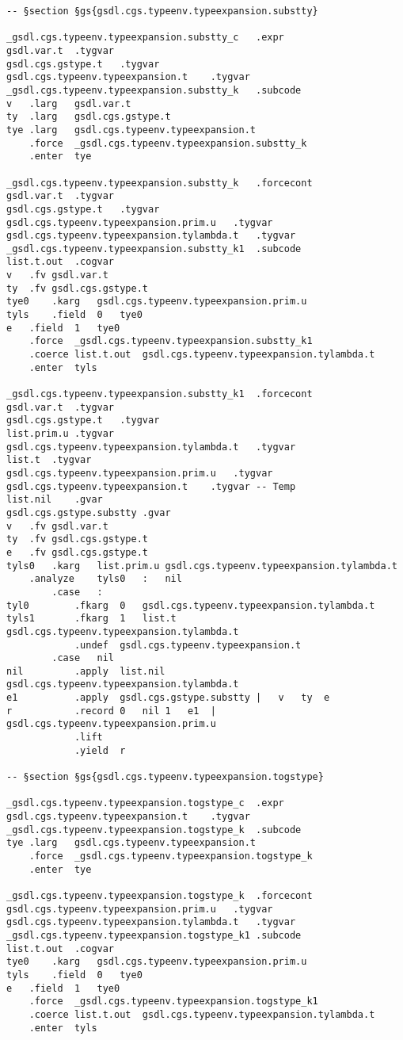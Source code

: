 \documentclass{report}
\begin{document}
\begin{verbatim}
-- §section §gs{gsdl.cgs.typeenv.typeexpansion.substty}

_gsdl.cgs.typeenv.typeexpansion.substty_c	.expr
gsdl.var.t	.tygvar
gsdl.cgs.gstype.t	.tygvar
gsdl.cgs.typeenv.typeexpansion.t	.tygvar
_gsdl.cgs.typeenv.typeexpansion.substty_k	.subcode
v	.larg	gsdl.var.t
ty	.larg	gsdl.cgs.gstype.t
tye	.larg	gsdl.cgs.typeenv.typeexpansion.t
	.force	_gsdl.cgs.typeenv.typeexpansion.substty_k
	.enter	tye

_gsdl.cgs.typeenv.typeexpansion.substty_k	.forcecont
gsdl.var.t	.tygvar
gsdl.cgs.gstype.t	.tygvar
gsdl.cgs.typeenv.typeexpansion.prim.u	.tygvar
gsdl.cgs.typeenv.typeexpansion.tylambda.t	.tygvar
_gsdl.cgs.typeenv.typeexpansion.substty_k1	.subcode
list.t.out	.cogvar
v	.fv	gsdl.var.t
ty	.fv	gsdl.cgs.gstype.t
tye0	.karg	gsdl.cgs.typeenv.typeexpansion.prim.u
tyls	.field	0	tye0
e	.field	1	tye0
	.force	_gsdl.cgs.typeenv.typeexpansion.substty_k1
	.coerce	list.t.out	gsdl.cgs.typeenv.typeexpansion.tylambda.t
	.enter	tyls

_gsdl.cgs.typeenv.typeexpansion.substty_k1	.forcecont
gsdl.var.t	.tygvar
gsdl.cgs.gstype.t	.tygvar
list.prim.u	.tygvar
gsdl.cgs.typeenv.typeexpansion.tylambda.t	.tygvar
list.t	.tygvar
gsdl.cgs.typeenv.typeexpansion.prim.u	.tygvar
gsdl.cgs.typeenv.typeexpansion.t	.tygvar	-- Temp
list.nil	.gvar
gsdl.cgs.gstype.substty	.gvar
v	.fv	gsdl.var.t
ty	.fv	gsdl.cgs.gstype.t
e	.fv	gsdl.cgs.gstype.t
tyls0	.karg	list.prim.u	gsdl.cgs.typeenv.typeexpansion.tylambda.t
	.analyze	tyls0	:	nil
		.case	:
tyl0		.fkarg	0	gsdl.cgs.typeenv.typeexpansion.tylambda.t
tyls1		.fkarg	1	list.t	gsdl.cgs.typeenv.typeexpansion.tylambda.t
			.undef	gsdl.cgs.typeenv.typeexpansion.t
		.case	nil
nil			.apply	list.nil	gsdl.cgs.typeenv.typeexpansion.tylambda.t
e1			.apply	gsdl.cgs.gstype.substty	|	v	ty	e
r			.record	0	nil	1	e1	|	gsdl.cgs.typeenv.typeexpansion.prim.u
			.lift
			.yield	r

-- §section §gs{gsdl.cgs.typeenv.typeexpansion.togstype}

_gsdl.cgs.typeenv.typeexpansion.togstype_c	.expr
gsdl.cgs.typeenv.typeexpansion.t	.tygvar
_gsdl.cgs.typeenv.typeexpansion.togstype_k	.subcode
tye	.larg	gsdl.cgs.typeenv.typeexpansion.t
	.force	_gsdl.cgs.typeenv.typeexpansion.togstype_k
	.enter	tye

_gsdl.cgs.typeenv.typeexpansion.togstype_k	.forcecont
gsdl.cgs.typeenv.typeexpansion.prim.u	.tygvar
gsdl.cgs.typeenv.typeexpansion.tylambda.t	.tygvar
_gsdl.cgs.typeenv.typeexpansion.togstype_k1	.subcode
list.t.out	.cogvar
tye0	.karg	gsdl.cgs.typeenv.typeexpansion.prim.u
tyls	.field	0	tye0
e	.field	1	tye0
	.force	_gsdl.cgs.typeenv.typeexpansion.togstype_k1
	.coerce	list.t.out	gsdl.cgs.typeenv.typeexpansion.tylambda.t
	.enter	tyls


\end{verbatim}
\end{document}
